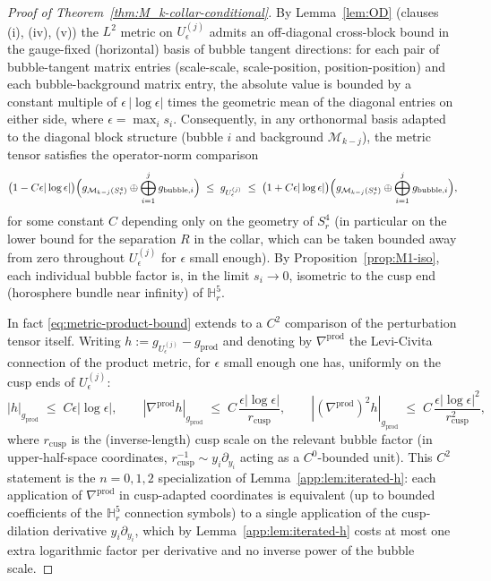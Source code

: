 \documentclass[11pt,letterpaper]{article}
\theoremstyle{definition}
\newcommand{\bbH}{\mathbb{H}}
\newcommand{\cM}{\mathcal{M}}
\begin{document}
\begin{proof}[Proof of Theorem~\ref{thm:M_k-collar-conditional}]
By Lemma~\ref{lem:OD} (clauses (i), (iv), (v)) the $L^2$ metric on $U_\epsilon^{(j)}$ admits an off-diagonal cross-block bound in the gauge-fixed (horizontal) basis of bubble tangent directions: for each pair of bubble-tangent matrix entries (scale-scale, scale-position, position-position) and each bubble-background matrix entry, the absolute value is bounded by a constant multiple of $\epsilon\,|\log\epsilon|$ times the geometric mean of the diagonal entries on either side, where $\epsilon = \max_i s_i$. Consequently, in any orthonormal basis adapted to the diagonal block structure (bubble $i$ and background $\cM_{k-j}$), the metric tensor satisfies the operator-norm comparison
\begin{equation}\label{eq:metric-product-bound}
\bigl(1 - C\epsilon|\log\epsilon|\bigr)\Bigl(g_{\cM_{k-j}(S^4_r)} \oplus \bigoplus_{i=1}^j g_{\mathrm{bubble},i}\Bigr) \;\le\; g_{U_\epsilon^{(j)}} \;\le\; \bigl(1 + C\epsilon|\log\epsilon|\bigr)\Bigl(g_{\cM_{k-j}(S^4_r)} \oplus \bigoplus_{i=1}^j g_{\mathrm{bubble},i}\Bigr),
\end{equation}
for some constant $C$ depending only on the geometry of $S^4_r$ (in particular on the lower bound for the separation $R$ in the collar, which can be taken bounded away from zero throughout $U_\epsilon^{(j)}$ for $\epsilon$ small enough). By Proposition~\ref{prop:M1-iso}, each individual bubble factor is, in the limit $s_i \to 0$, isometric to the cusp end (horosphere bundle near infinity) of $\bbH^5_r$.

In fact \eqref{eq:metric-product-bound} extends to a $C^2$ comparison of the perturbation tensor itself. Writing $h := g_{U_\epsilon^{(j)}} - g_{\mathrm{prod}}$ and denoting by $\nabla^{\mathrm{prod}}$ the Levi-Civita connection of the product metric, for $\epsilon$ small enough one has, uniformly on the cusp ends of $U_\epsilon^{(j)}$:
\begin{equation}\label{eq:metric-product-bound-C2}
|h|_{g_{\mathrm{prod}}} \;\le\; C\epsilon|\log\epsilon|, \qquad
|\nabla^{\mathrm{prod}} h|_{g_{\mathrm{prod}}} \;\le\; C\,\frac{\epsilon|\log\epsilon|}{r_{\mathrm{cusp}}}, \qquad
|(\nabla^{\mathrm{prod}})^{2} h|_{g_{\mathrm{prod}}} \;\le\; C\,\frac{\epsilon|\log\epsilon|^{2}}{r_{\mathrm{cusp}}^{2}},
\end{equation}
where $r_{\mathrm{cusp}}$ is the (inverse-length) cusp scale on the relevant bubble factor (in upper-half-space coordinates, $r_{\mathrm{cusp}}^{-1} \sim y_i\partial_{y_i}$ acting as a $C^0$-bounded unit). This $C^2$ statement is the $n = 0, 1, 2$ specialization of Lemma~\ref{app:lem:iterated-h}: each application of $\nabla^{\mathrm{prod}}$ in cusp-adapted coordinates is equivalent (up to bounded coefficients of the $\bbH^5_r$ connection symbols) to a single application of the cusp-dilation derivative $y_i\partial_{y_i}$, which by Lemma~\ref{app:lem:iterated-h} costs at most one extra logarithmic factor per derivative and no inverse power of the bubble scale.


\end{proof}
\end{document}
